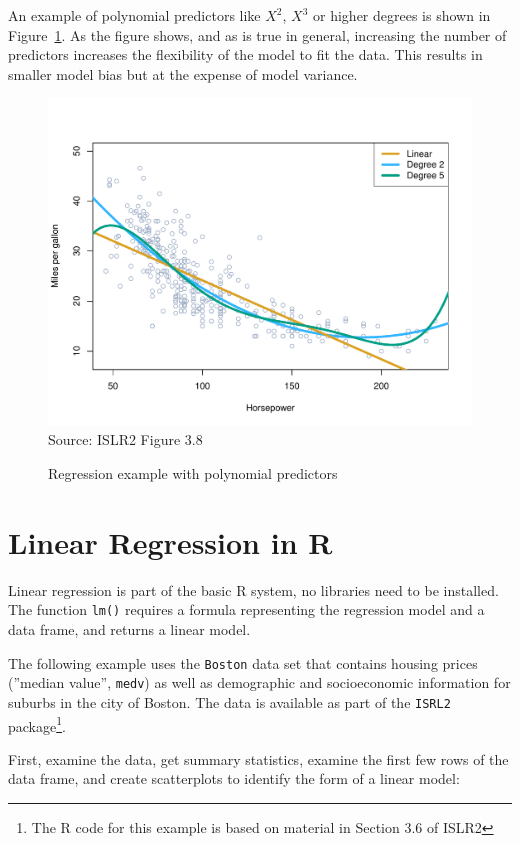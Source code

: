 An example of polynomial predictors like $X^2$, $X^3$ or higher degrees is shown in Figure~\ref{fig:polynomial_chap12}. As the figure shows, and as is true in general, increasing the number of predictors increases the flexibility of the model to fit the data. This results in smaller model bias but at the expense of model variance. 

\begin{figure}
\centering

\includegraphics[width=.8\textwidth]{../class11/Figures_Chapters_1-6/Chapter3/3_8.pdf} \\

\scriptsize Source: ISLR2 Figure 3.8
\caption{Regression example with polynomial predictors}
\label{fig:polynomial_chap12}
\end{figure}


\FloatBarrier
\section{Linear Regression in R}

Linear regression is part of the basic R system, no libraries need to be installed. The function \texttt{lm()} requires a formula representing the regression model and a data frame, and returns a linear model. 

The following example uses the \texttt{Boston} data set that contains housing prices (''median value'', \texttt{medv}) as well as demographic and socioeconomic information for suburbs in the city of Boston. The data is available as part of the \texttt{ISRL2} package\footnote{The R code for this example is based on material in Section 3.6 of ISLR2}.

First, examine the data, get summary statistics, examine the first few rows of the data frame, and create scatterplots to identify the form of a linear model:


